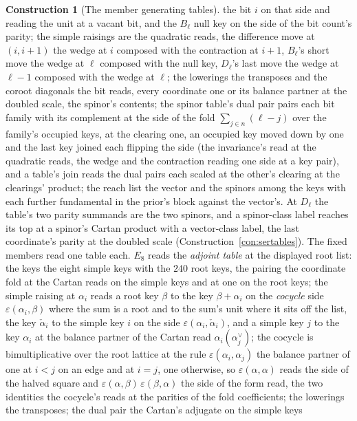 \documentclass[11pt]{article}
\theoremstyle{definition}
\newtheorem{construction}{Construction}
\begin{document}
\begin{construction}[The member generating tables]
the bit $i$ on that side and reading the unit at a vacant bit, and
the $B_\ell$ null key on the side of the bit count's parity; the
simple raisings are the quadratic reads, the difference move at
$(i,i{+}1)$ the wedge at $i$ composed with the contraction at
$i{+}1$, $B_\ell$'s short move the wedge at $\ell$ composed with
the null key, $D_\ell$'s last move the wedge at $\ell{-}1$
composed with the wedge at $\ell$; the lowerings the transposes
and the coroot diagonals the bit reads, every coordinate one or
its balance partner at the doubled scale, the spinor's contents;
the spinor table's dual pair pairs each bit family with its
complement at the side of the fold $\sum_{j\in n}(\ell-j)$ over
the family's occupied keys, at the clearing one, an occupied key
moved down by one and the last key joined each flipping the side
(the invariance's read at the quadratic reads, the wedge and the
contraction reading one side at a key pair), and a table's join
reads the dual pairs each scaled at the other's clearing at the
clearings' product; the reach list the vector and the spinors
among the keys with each further fundamental in the prior's block
against the vector's. At $D_\ell$ the table's two parity summands
are the two spinors, and a spinor-class label reaches its top at a
spinor's Cartan product with a vector-class label, the last
coordinate's parity at the doubled scale
(Construction~\ref{con:sertables}). The fixed members read one
table each. $E_8$ reads the \emph{adjoint table} at the displayed
root list:
the keys the eight simple keys with the $240$ root keys, the
pairing the coordinate fold at the Cartan reads on the simple keys
and at one on the root keys; the simple raising at $\alpha_i$
reads a root key $\beta$ to the key $\beta+\alpha_i$ on the
\emph{cocycle} side $\varepsilon(\alpha_i,\beta)$ where the sum is
a root and to the sum's unit where it sits off the list, the key
$\check\alpha_i$ to the simple key $i$ on the side
$\varepsilon(\alpha_i,\check\alpha_i)$, and a simple key $j$ to the
key $\alpha_i$ at the balance partner of the Cartan read
$\alpha_i(\alpha_j^\vee)$; the cocycle is bimultiplicative over
the root lattice at the rule $\varepsilon(\alpha_i,\alpha_j)$ the
balance partner of one at $i<j$ on an edge and at $i=j$, one
otherwise, so $\varepsilon(\alpha,\alpha)$ reads the side of the
halved square and $\varepsilon(\alpha,\beta)\,\varepsilon(\beta,\alpha)$
the side of the form read, the two identities the cocycle's reads
at the parities of the fold coefficients; the lowerings the
transposes; the dual pair the Cartan's adjugate on the simple keys

\end{construction}
\end{document}
